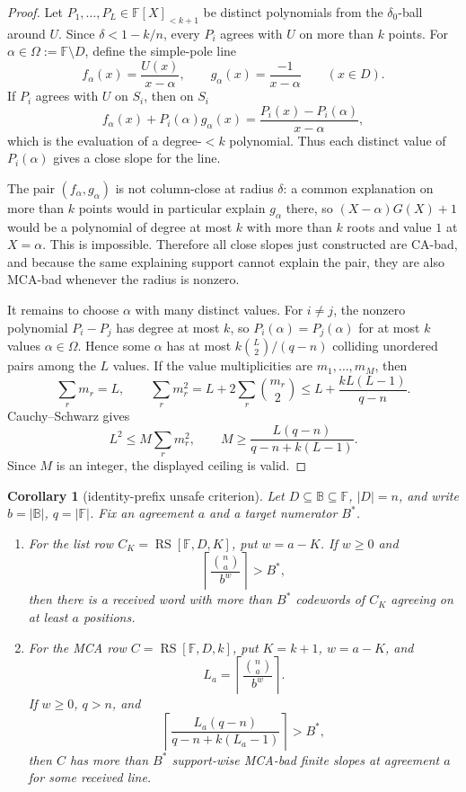 \documentclass[a4paper,11pt]{amsart}
\newtheorem{corollary}[theorem]{Corollary}
\theoremstyle{remark}
\newcommand{\F}{\mathbb F}
\newcommand{\B}{\mathbb B}
\newcommand{\RS}{\operatorname{RS}}
\begin{document}
\begin{proof}
Let \(P_1,\ldots,P_L\in\F[X]_{<k+1}\) be distinct polynomials from the \(\delta_0\)-ball around \(U\).  Since \(\delta<1-k/n\), every \(P_i\) agrees with \(U\) on more than \(k\) points.  For \(\alpha\in\Omega:=\F\setminus D\), define the simple-pole line
\[
        f_\alpha(x)=\frac{U(x)}{x-\alpha},
        \qquad
        g_\alpha(x)=\frac{-1}{x-\alpha}
        \qquad(x\in D).
\]
If \(P_i\) agrees with \(U\) on \(S_i\), then on \(S_i\)
\[
        f_\alpha(x)+P_i(\alpha)g_\alpha(x)
        =\frac{P_i(x)-P_i(\alpha)}{x-\alpha},
\]
which is the evaluation of a degree-\(<k\) polynomial.  Thus each distinct value of \(P_i(\alpha)\) gives a close slope for the line.

The pair \((f_\alpha,g_\alpha)\) is not column-close at radius \(\delta\): a common explanation on more than \(k\) points would in particular explain \(g_\alpha\) there, so \((X-\alpha)G(X)+1\) would be a polynomial of degree at most \(k\) with more than \(k\) roots and value \(1\) at \(X=\alpha\).  This is impossible.  Therefore all close slopes just constructed are CA-bad, and because the same explaining support cannot explain the pair, they are also MCA-bad whenever the radius is nonzero.

It remains to choose \(\alpha\) with many distinct values.  For \(i\ne j\), the nonzero polynomial \(P_i-P_j\) has degree at most \(k\), so \(P_i(\alpha)=P_j(\alpha)\) for at most \(k\) values \(\alpha\in\Omega\).  Hence some \(\alpha\) has at most \(k\binom L2/(q-n)\) colliding unordered pairs among the \(L\) values.  If the value multiplicities are \(m_1,\ldots,m_M\), then
\[
        \sum_r m_r=L,\qquad
        \sum_r m_r^2
        =L+2\sum_r\binom{m_r}{2}
        \le L+\frac{kL(L-1)}{q-n}.
\]
Cauchy--Schwarz gives
\[
        L^2\le M\sum_r m_r^2,
        \qquad
        M\ge \frac{L(q-n)}{q-n+k(L-1)}.
\]
Since \(M\) is an integer, the displayed ceiling is valid.
\end{proof}

\begin{corollary}[identity-prefix unsafe criterion]\label{cor:identity-prefix-unsafe}
Let \(D\subseteq\B\subseteq\F\), \(|D|=n\), and write \(b=|\B|\), \(q=|\F|\).  Fix an agreement \(a\) and a target numerator \(B^*\).
\begin{enumerate}[label=\textup{(\roman*)}]
\item For the list row \(C_K=\RS[\F,D,K]\), put \(w=a-K\).  If \(w\ge0\) and
\[
        \left\lceil\frac{\binom na}{b^w}\right\rceil>B^*,
\]
then there is a received word with more than \(B^*\) codewords of \(C_K\) agreeing on at least \(a\) positions.
\item For the MCA row \(C=\RS[\F,D,k]\), put \(K=k+1\), \(w=a-K\), and
\[
        L_a=\left\lceil\frac{\binom na}{b^w}\right\rceil .
\]
If \(w\ge0\), \(q>n\), and
\[
        \left\lceil \frac{L_a(q-n)}{q-n+k(L_a-1)}\right\rceil>B^*,
\]
then \(C\) has more than \(B^*\) support-wise MCA-bad finite slopes at agreement \(a\) for some received line.
\end{enumerate}
\end{corollary}
\end{document}
